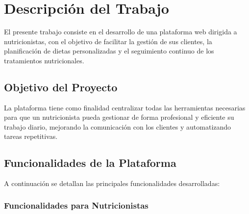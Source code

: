 \chapter{Descripción del Trabajo}
\label{cap:descripcionTrabajo}

El presente trabajo consiste en el desarrollo de una plataforma web dirigida a nutricionistas, con el objetivo de facilitar la gestión de sus clientes, la planificación de dietas personalizadas y el seguimiento continuo de los tratamientos nutricionales.

\section{Objetivo del Proyecto}

La plataforma tiene como finalidad centralizar todas las herramientas necesarias para que un nutricionista pueda gestionar de forma profesional y eficiente su trabajo diario, mejorando la comunicación con los clientes y automatizando tareas repetitivas.

\section{Funcionalidades de la Plataforma}

A continuación se detallan las principales funcionalidades desarrolladas:

\subsection{Funcionalidades para Nutricionistas}

